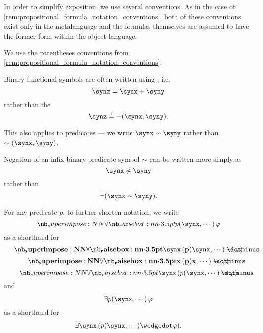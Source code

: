 \begin{remark}\label{rem:first_order_formula_conventions}
  In order to simplify exposition, we use several conventions. As in the case of \cref{rem:propositional_formula_notation_conventions}, both of these conventions exist only in the metalanguage and the formulas themselves are assumed to have the former form within the object language.
  \begin{thmenum}
     We use the parentheses conventions from \cref{rem:propositional_formula_notation_conventions}.

     Binary functional symbols are often written using , i.e.
    \begin{equation*}
      \synz \syneq \synx + \syny
    \end{equation*}
    rather than the 
    \begin{equation*}
      \synz \syneq +(\synx, \syny).
    \end{equation*}

    This also applies to predicates --- we write \( \synx \sim \syny \) rather than \( \sim(\synx, \syny) \).

     Negation of an infix binary predicate symbol \( \sim \) can be written more simply as
    \begin{equation*}
      \synx \not\sim \syny
    \end{equation*}
    rather than
    \begin{equation*}
      \synneg(\synx \sim \syny).
    \end{equation*}

     For any predicate \( p \), to further shorten notation, we write
    \begin{equation*}
      \qforall {p(\synx, \cdots)} \varphi
    \end{equation*}
    as a shorthand for
    \begin{equation*}
      \mathbf{\qforall \synx (p(\synx, \cdots) \synimplies \varphi)}
    \end{equation*}
    \begin{equation*}
      \mathbf{\qforall x (p(x, \cdots) \synimplies \varphi)}
    \end{equation*}
    \begin{equation*}
      \qforall \synx (p(\synx, \cdots) \synimplies \varphi)
    \end{equation*}
    and
    \begin{equation*}
      \qexists {p(\synx, \cdots)} \varphi
    \end{equation*}
    as a shorthand for
    \begin{equation*}
      \qexists \synx (p(\synx, \cdots) \synwedge \varphi).
    \end{equation*}


\end{thmenum}
\end{remark}
